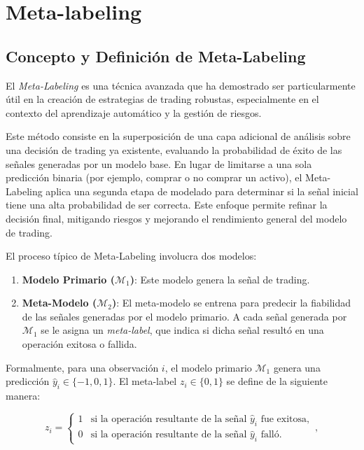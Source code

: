 \documentclass[a4paper,12pt, twoside]{report}
\begin{document}
\chapter{Meta-labeling}

\section{Concepto y Definición de Meta-Labeling}


El \textit{Meta-Labeling} es una técnica avanzada que ha demostrado ser particularmente útil
en la creación de estrategias de trading robustas, especialmente en el contexto del aprendizaje
automático y la gestión de riesgos. 

Este método consiste en la superposición de una capa
adicional de análisis sobre una decisión de trading ya existente, evaluando la probabilidad 
de éxito de las señales generadas por un modelo base. En lugar de limitarse
a una sola predicción binaria (por ejemplo, comprar o no comprar un activo), el Meta-
Labeling aplica una segunda etapa de modelado para determinar si la señal inicial tiene
una alta probabilidad de ser correcta. Este enfoque permite refinar la decisión final,
mitigando riesgos y mejorando el rendimiento general del modelo de trading.

El proceso típico de Meta-Labeling involucra dos modelos:
\begin{enumerate}
    \item \textbf{Modelo Primario ($\mathcal{M}_1$)}: Este modelo genera la señal de 
    trading.
    \item \textbf{Meta-Modelo ($\mathcal{M}_2$)}: El meta-modelo se entrena para 
    predecir la fiabilidad de las señales generadas por el modelo primario. A cada 
    señal generada por $\mathcal{M}_1$ se le asigna un \textit{meta-label}, que 
    indica si dicha señal resultó en una operación exitosa o fallida.
\end{enumerate}

Formalmente, para una observación $i$, el modelo primario $\mathcal{M}_1$ genera 
una predicción $\hat{y}_i \in \{-1, 0, 1\}$. El meta-label $z_i \in \{0, 1\}$ se 
define de la siguiente manera:

\begin{equation}
z_i = \begin{cases} 
1 & \text{si la operación resultante de la señal } \hat{y}_i \text{ fue exitosa}, \\
0 & \text{si la operación resultante de la señal } \hat{y}_i \text{ falló}.
\end{cases},
\end{equation}
\end{document}
